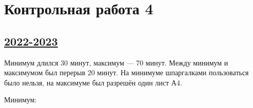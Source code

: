 
\newpage
\thispagestyle{empty}
\section{Контрольная работа 4}


\subsection[2022-2023]{\hyperref[sec:sol_kr_04_2022_2023]{2022-2023}}
\label{sec:kr_04_2022_2023}

Минимум длился 30 минут, максимум — 70 минут. Между минимум и максимумом был перерыв 20 минут. 
На минимуме шпаргалками пользоваться было нельзя, на максимуме был разрешён один лист А4.

Минимум: 

